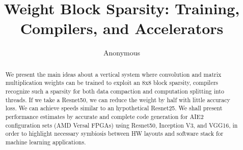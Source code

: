 \documentclass{IEEEtran}
\begin{document}
\title{Weight Block Sparsity: Training, Compilers, and Accelerators}


\author{Anonymous}


\maketitle


\begin{abstract}
We present the main ideas about a vertical system where convolution
and matrix multiplication weights can be trained to exploit an 8x8
block sparsity, compilers recognize such a sparsity for both data
compaction and computation splitting into threads. If we take a
Resnet50, we can reduce the weight by half with little accuracy
loss. We can achieve speeds similar to an hypothetical Resnet25. We
shall present performance estimates by accurate and complete code
generation for AIE2 configuration sets (AMD Versal FPGAs) using
Resnet50, Inception V3, and VGG16, in order to highlight necessary
symbiosis between HW layouts and software stack for machine learning
applications.
\end{abstract}


\end{document}
